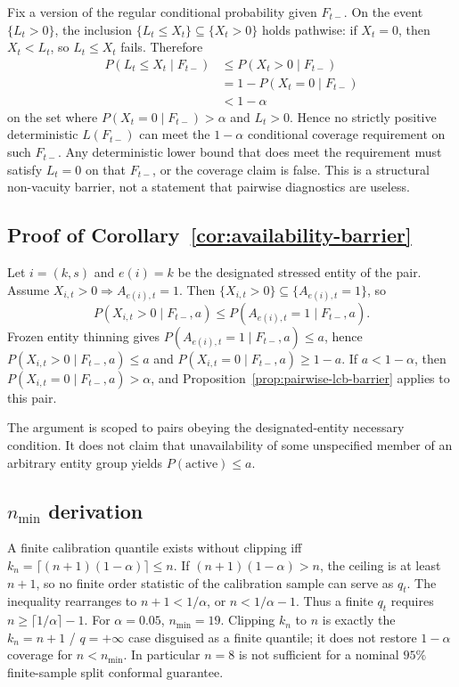 Fix a version of the regular conditional probability given $F_{t-}$.  On the
event $\{L_t>0\}$, the inclusion $\{L_t\le X_t\}\subseteq\{X_t>0\}$ holds
pathwise: if $X_t=0$, then $X_t<L_t$, so $L_t\le X_t$ fails.  Therefore
\begin{align*}
P(L_t\le X_t\mid F_{t-})
&\le
P(X_t>0\mid F_{t-}) \\
&=
1-P(X_t=0\mid F_{t-}) \\
&<
1-\alpha
\end{align*}
on the set where $P(X_t=0\mid F_{t-})>\alpha$ and $L_t>0$.  Hence no strictly
positive deterministic $L(F_{t-})$ can meet the $1-\alpha$ conditional coverage
requirement on such $F_{t-}$.  Any deterministic lower bound that does meet
the requirement must satisfy $L_t=0$ on that $F_{t-}$, or the coverage claim
is false.  This is a structural non-vacuity barrier, not a statement that
pairwise diagnostics are useless.

\subsection{Proof of Corollary~\ref{cor:availability-barrier}}
\label{app:proof_availability_barrier}

Let $i=(k,s)$ and $e(i)=k$ be the designated stressed entity of the pair.
Assume $X_{i,t}>0\Rightarrow A_{e(i),t}=1$.  Then
$\{X_{i,t}>0\}\subseteq\{A_{e(i),t}=1\}$, so
\[
 P(X_{i,t}>0\mid F_{t-},a)
 \le
 P(A_{e(i),t}=1\mid F_{t-},a).
\]
Frozen entity thinning gives $P(A_{e(i),t}=1\mid F_{t-},a)\le a$, hence
$P(X_{i,t}>0\mid F_{t-},a)\le a$ and $P(X_{i,t}=0\mid F_{t-},a)\ge 1-a$.
If $a<1-\alpha$, then $P(X_{i,t}=0\mid F_{t-},a)>\alpha$, and
Proposition~\ref{prop:pairwise-lcb-barrier} applies to this pair.

The argument is scoped to pairs obeying the designated-entity necessary
condition.  It does not claim that unavailability of some unspecified member
of an arbitrary entity group yields $P(\mathrm{active})\le a$.

\subsection{$n_{\min}$ derivation}
\label{app:nmin}

A finite calibration quantile exists without clipping iff
$k_n=\lceil(n+1)(1-\alpha)\rceil\le n$.  If $(n+1)(1-\alpha)>n$, the ceiling is
at least $n+1$, so no finite order statistic of the calibration sample can
serve as $q_t$.  The inequality rearranges to $n+1<1/\alpha$, or
$n<1/\alpha-1$.  Thus a finite $q_t$ requires
$n\ge\lceil 1/\alpha\rceil-1$.  For $\alpha=0.05$, $n_{\min}=19$.  Clipping
$k_n$ to $n$ is exactly the $k_n=n+1$ / $q=+\infty$ case disguised as a finite
quantile; it does not restore $1-\alpha$ coverage for $n<n_{\min}$.  In
particular $n=8$ is not sufficient for a nominal $95\%$ finite-sample split
conformal guarantee.

